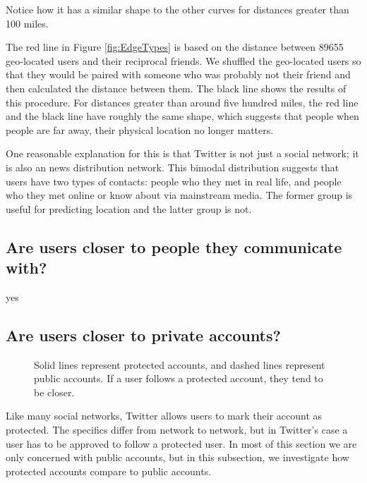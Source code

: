 \documentclass{sig-alternate}
\begin{document}
Notice how it has a similar shape to the other curves for distances greater than 100 miles.

The red line in Figure \ref{fig:EdgeTypes} is based on the distance between
89655 geo-located users and their reciprocal friends. We shuffled the
geo-located users so that they would be paired with someone who was probably
not their friend and then calculated the distance between them. The black line
shows the results of this procedure. For distances greater than around five
hundred miles, the red line and the black line have roughly the same shape,
which suggests that people when people are far away, their physical location no longer matters.

One reasonable explanation for this is that Twitter is not just a social
network; it is also an news distribution network.  This bimodal distribution
suggests that users have two types of contacts: people who they met in
real life, and people who they met online or know about via mainstream media.
The former group is useful for predicting location and the latter group is not.


\subsection{Are users closer to people they communicate with?}
\begin{figure*}
\centering
{}
\caption{
}
\label{fig:ComTypes}
\end{figure*}

yes

\subsection{Are users closer to private accounts?}
\begin{figure}
\centering
{}
\caption{ Solid lines represent protected accounts, and dashed lines represent
public accounts. If a user follows a protected account, they tend to be closer.}
\label{fig:EdgeTypesProt}
\end{figure}

Like many social networks, Twitter allows users to mark their account as protected. The specifics differ from network to network, but in Twitter's case a user has to be approved to follow a protected user.
In most of this section we are only concerned with public accounts, but in this subsection, we investigate how protected accounts compare to public accounts.
\end{document}
